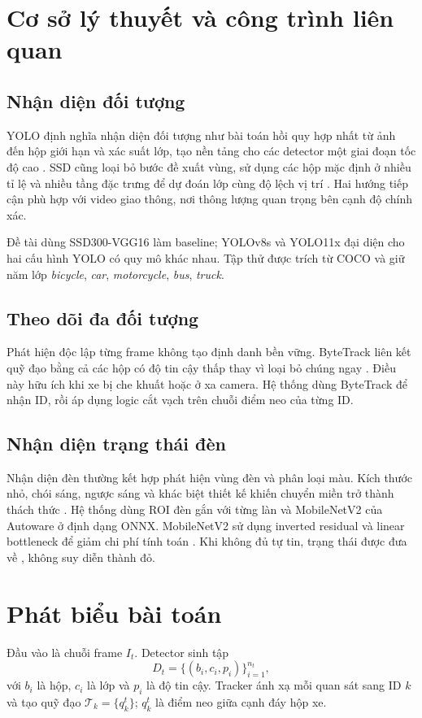 \documentclass[11pt,a4paper]{article}
\newcommand{\code}[1]{{\small\texttt{\detokenize{#1}}}}
\begin{document}
\section{Cơ sở lý thuyết và công trình liên quan}
\subsection{Nhận diện đối tượng}
YOLO định nghĩa nhận diện đối tượng như bài toán hồi quy hợp nhất từ ảnh đến hộp giới hạn và xác suất lớp, tạo nền tảng cho các detector một giai đoạn tốc độ cao \citep{redmon2016}. SSD cũng loại bỏ bước đề xuất vùng, sử dụng các hộp mặc định ở nhiều tỉ lệ và nhiều tầng đặc trưng để dự đoán lớp cùng độ lệch vị trí \citep{liu2016}. Hai hướng tiếp cận phù hợp với video giao thông, nơi thông lượng quan trọng bên cạnh độ chính xác.

Đề tài dùng SSD300-VGG16 làm baseline; YOLOv8s và YOLO11x đại diện cho hai cấu hình YOLO có quy mô khác nhau. Tập thử được trích từ COCO \citep{lin2014} và giữ năm lớp \textit{bicycle}, \textit{car}, \textit{motorcycle}, \textit{bus}, \textit{truck}.

\subsection{Theo dõi đa đối tượng}
Phát hiện độc lập từng frame không tạo định danh bền vững. ByteTrack liên kết quỹ đạo bằng cả các hộp có độ tin cậy thấp thay vì loại bỏ chúng ngay \citep{zhang2022}. Điều này hữu ích khi xe bị che khuất hoặc ở xa camera. Hệ thống dùng ByteTrack để nhận ID, rồi áp dụng logic cắt vạch trên chuỗi điểm neo của từng ID.

\subsection{Nhận diện trạng thái đèn}
Nhận diện đèn thường kết hợp phát hiện vùng đèn và phân loại màu. Kích thước nhỏ, chói sáng, ngược sáng và khác biệt thiết kế khiến chuyển miền trở thành thách thức \citep{pon2023}. Hệ thống dùng ROI đèn gắn với từng làn và MobileNetV2 của Autoware ở định dạng ONNX. MobileNetV2 sử dụng inverted residual và linear bottleneck để giảm chi phí tính toán \citep{sandler2018}. Khi không đủ tự tin, trạng thái được đưa về \code{UNKNOWN}, không suy diễn thành đỏ.

\section{Phát biểu bài toán}
Đầu vào là chuỗi frame $I_t$. Detector sinh tập
\begin{equation}
D_t=\{(b_i,c_i,p_i)\}_{i=1}^{n_t},
\end{equation}
với $b_i$ là hộp, $c_i$ là lớp và $p_i$ là độ tin cậy. Tracker ánh xạ mỗi quan sát sang ID $k$ và tạo quỹ đạo $\mathcal{T}_k=\{q_k^t\}$; $q_k^t$ là điểm neo giữa cạnh đáy hộp xe.
\end{document}
